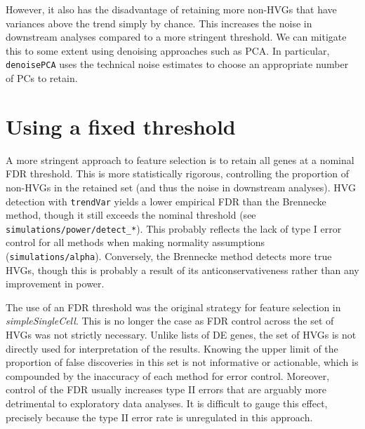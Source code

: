 \documentclass{article}
\newcommand\code[1]{{\small\texttt{#1}}}
\begin{document}
However, it also has the disadvantage of retaining more non-HVGs that have variances above the trend simply by chance.
This increases the noise in downstream analyses compared to a more stringent threshold.
We can mitigate this to some extent using denoising approaches such as PCA.
In particular, \code{denoisePCA} uses the technical noise estimates to choose an appropriate number of PCs to retain.

\section{Using a fixed threshold}
A more stringent approach to feature selection is to retain all genes at a nominal FDR threshold.
This is more statistically rigorous, controlling the proportion of non-HVGs in the retained set (and thus the noise in downstream analyses).
HVG detection with \code{trendVar} yields a lower empirical FDR than the Brennecke method, though it still exceeds the nominal threshold (see \texttt{simulations/power/detect\_*}).
This probably reflects the lack of type I error control for all methods when making normality assumptions (\texttt{simulations/alpha}).
Conversely, the Brennecke method detects more true HVGs, though this is probably a result of its anticonservativeness rather than any improvement in power.

The use of an FDR threshold was the original strategy for feature selection in \textit{simpleSingleCell}.
This is no longer the case as FDR control across the set of HVGs was not strictly necessary.
Unlike lists of DE genes, the set of HVGs is not directly used for interpretation of the results.
Knowing the upper limit of the proportion of false discoveries in this set is not informative or actionable, 
which is compounded by the inaccuracy of each method for error control.
Moreover, control of the FDR usually increases type II errors that are arguably more detrimental to exploratory data analyses.
It is difficult to gauge this effect, precisely because the type II error rate is unregulated in this approach.
\end{document}
